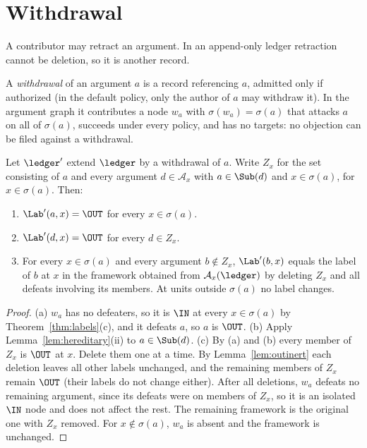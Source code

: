 \section{Withdrawal}

A contributor may retract an argument. In an append-only ledger retraction cannot be deletion, so it is another record.

\begin{definition}[Withdrawal]\label{def:withdrawal}
A \emph{withdrawal} of an argument $a$ is a record referencing $a$, admitted only if authorized (in the default policy, only the author of $a$ may withdraw it). In the argument graph it contributes a node $w_a$ with $\sigma(w_a)=\sigma(a)$ that attacks $a$ on all of $\sigma(a)$, succeeds under every policy, and has no targets: no objection can be filed against a withdrawal.
\end{definition}

\begin{theorem}\label{thm:withdraw}
Let $\ledger'$ extend $\ledger$ by a withdrawal of $a$. Write $Z_x$ for the set consisting of $a$ and every argument $d\in\mathcal A_x$ with $a\in\Sub(d)$ and $x\in\sigma(a)$, for $x\in\sigma(a)$. Then:
\begin{enumerate}[label=(\alph*)]
\item $\Lab'(a,x)=\OUT$ for every $x\in\sigma(a)$.
\item $\Lab'(d,x)=\OUT$ for every $d\in Z_x$.
\item For every $x\in\sigma(a)$ and every argument $b\notin Z_x$, $\Lab'(b,x)$ equals the label of $b$ at $x$ in the framework obtained from $\mathcal A_x(\ledger)$ by deleting $Z_x$ and all defeats involving its members. At units outside $\sigma(a)$ no label changes.
\end{enumerate}
\end{theorem}

\begin{proof}
(a) $w_a$ has no defeaters, so it is $\IN$ at every $x\in\sigma(a)$ by Theorem~\ref{thm:labels}(c), and it defeats $a$, so $a$ is $\OUT$. (b) Apply Lemma~\ref{lem:hereditary}(ii) to $a\in\Sub(d)$.
(c) By (a) and (b) every member of $Z_x$ is $\OUT$ at $x$. Delete them one at a time. By Lemma~\ref{lem:outinert} each deletion leaves all other labels unchanged, and the remaining members of $Z_x$ remain $\OUT$ (their labels do not change either). After all deletions, $w_a$ defeats no remaining argument, since its defeats were on members of $Z_x$, so it is an isolated $\IN$ node and does not affect the rest. The remaining framework is the original one with $Z_x$ removed. For $x\notin\sigma(a)$, $w_a$ is absent and the framework is unchanged.
\end{proof}

